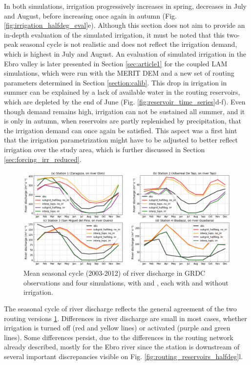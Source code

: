 In both simulations, irrigation progressively increases in spring, decreases in July and August, before increasing once again in autumn (Fig. \ref{fig:irrigation_halfdeg_eval}e). Although this section does not aim to provide an in-depth evaluation of the simulated irrigation, it must be noted that this two-peak seasonal cycle is not realistic and does not reflect the irrigation demand, which is highest in July and August. 
An evaluation of simulated irrigation in the Ebro valley is later presented in Section \ref{sec:article1} for the coupled LAM simulations, which were run with the MERIT DEM and a new set of routing parameters determined in Section \ref{section:calib}.
This drop in irrigation in summer can be explained by a lack of available water in the routing reservoirs, which are depleted by the end of June (Fig. \ref{fig:reservoir_time_series}d-f). Even though demand remains high, irrigation can not be sustained all summer, and it is only in autumn, when reservoirs are partly replenished by precipitation, that the irrigation demand can once again be satisfied. This aspect was a first hint that the irrigation parametrization might have to be adjusted to better reflect irrigation over the study area, which is further discussed in Section \ref{sec:forcing_irr_reduced}.

\begin{figure}[htbp]
    \centering
    \includegraphics[width=\textwidth]{images/chap3/river_discharge/halfdeg_4stations_SC.png}
    \caption{Mean seasonal cycle (2003-2012) of river discharge in GRDC observations and four simulations, with \native and \std, each with and without irrigation.}
    \label{fig:halfdeg_stations_SC}
\end{figure}

The seasonal cycle of river discharge reflects the general agreement of the two routing versions \ref{fig:halfdeg_stations_SC}. Differences in river discharge are small in most cases, whether irrigation is turned off (red and yellow lines) or activated (purple and green lines). Some differences persist, due to the differences in the routing network already described, mostly for the Ebro river since the station is downstream of several important discrepancies visible on Fig. \ref{fig:routing_reservoirs_halfdeg}l.

